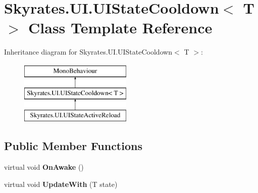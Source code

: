 \hypertarget{class_skyrates_1_1_u_i_1_1_u_i_state_cooldown_3_01_t_01_4}{\section{Skyrates.\-U\-I.\-U\-I\-State\-Cooldown$<$ T $>$ Class Template Reference}
\label{class_skyrates_1_1_u_i_1_1_u_i_state_cooldown_3_01_t_01_4}
}
Inheritance diagram for Skyrates.\-U\-I.\-U\-I\-State\-Cooldown$<$ T $>$\-:\begin{figure}[H]
\begin{center}
\leavevmode
\includegraphics[height=3.000000cm]{class_skyrates_1_1_u_i_1_1_u_i_state_cooldown_3_01_t_01_4}
\end{center}
\end{figure}
\subsection*{Public Member Functions}
\begin{DoxyCompactItemize}
\item 
\hypertarget{class_skyrates_1_1_u_i_1_1_u_i_state_cooldown_3_01_t_01_4_a092f2f3bd61ddc7a96867077e7cc5ee4}{virtual void {\bfseries On\-Awake} ()}\label{class_skyrates_1_1_u_i_1_1_u_i_state_cooldown_3_01_t_01_4_a092f2f3bd61ddc7a96867077e7cc5ee4}

\item 
\hypertarget{class_skyrates_1_1_u_i_1_1_u_i_state_cooldown_3_01_t_01_4_ac6383a8c320a85b8b09766efd284d119}{virtual void {\bfseries Update\-With} (T state)}\label{class_skyrates_1_1_u_i_1_1_u_i_state_cooldown_3_01_t_01_4_ac6383a8c320a85b8b09766efd284d119}

\end{DoxyCompactItemize}
